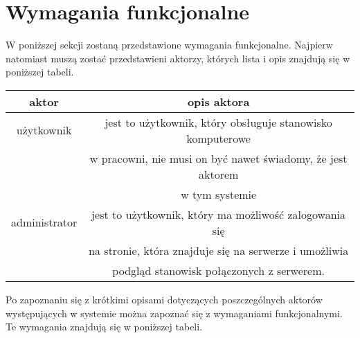 \section {Wymagania funkcjonalne}
W poniższej sekcji zostaną przedstawione wymagania funkcjonalne. Najpierw natomiast muszą zostać przedstawieni aktorzy, których lista i opis znajdują się w poniższej tabeli.
\newline
\begin{tabular}{|c|c|} \hline
aktor & opis aktora \\ \hline
użytkownik   & jest to użytkownik, który obsługuje stanowisko komputerowe\\
             & w pracowni, nie musi on być nawet świadomy, że jest aktorem\\
             & w tym systemie \\ \hline

administrator   & jest to użytkownik, który ma możliwość zalogowania się \\
                & na stronie, która znajduje się na serwerze i umożliwia \\
                & podgląd stanowisk połączonych z serwerem. \\ \hline

\end{tabular}
\newline\newline
Po zapoznaniu się z krótkimi opisami dotyczących poszczególnych aktorów występujących w systemie
można zapoznać się z wymaganiami funkcjonalnymi. Te wymagania znajdują się w poniższej tabeli.
\newline\newline

